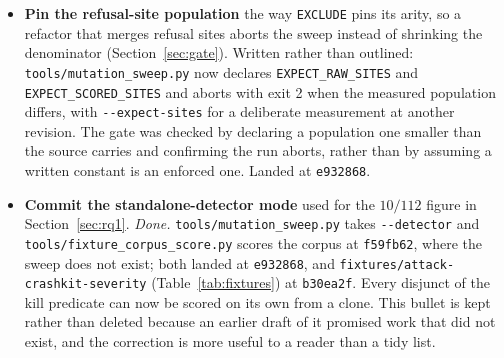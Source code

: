 \documentclass[11pt]{article}
\begin{document}
\begin{itemize}
red on another: the same host-dependence class the patch exists to remove. At
\texttt{ce462e10}, the head of the pull request on 2026-08-18 and resolvable only through
\texttt{git fetch origin pull/2/head} because the branch sits on a fork, those tests build
their structure in Python instead, and both issuer-data traversals are iterative with explicit
stacks, so the stated blocker is met by the pull request itself. The head carries a date
because it moved during drafting: the earlier \texttt{bb4dda36}, which this bullet named
first, still asserted a wall-clock bound on elapsed time, an instance of the same
host-dependence class; \texttt{ce462e10} drops that assertion and leaves \texttt{vac/}
byte-identical. What remains is review and merge. An earlier draft of this paper still
described the blocker as open, having been written against a stale reading of the branch;
that is instrument failure 4 recurring inside the paper's own outstanding-work list, which is
why it is corrected here in place rather than dropped.

\item \textbf{Pin the refusal-site population} the way \texttt{EXCLUDE} pins its arity, so a
refactor that merges refusal sites aborts the sweep instead of shrinking the denominator
(Section~\ref{sec:gate}). Written rather than outlined: \texttt{tools/mutation\_sweep.py} now
declares \texttt{EXPECT\_RAW\_SITES} and \texttt{EXPECT\_SCORED\_SITES} and aborts with exit 2
when the measured population differs, with \texttt{-{}-expect-sites} for a deliberate
measurement at another revision. The gate was checked by declaring a population one smaller
than the source carries and confirming the run aborts, rather than by assuming a written
constant is an enforced one. Landed at \texttt{e932868}.

\item \textbf{Commit the standalone-detector mode} used for the $10/112$ figure in
Section~\ref{sec:rq1}. \emph{Done.} \texttt{tools/mutation\_sweep.py} takes
\texttt{-{}-detector} and \texttt{tools/fixture\_corpus\_score.py} scores the corpus at
\texttt{f59fb62}, where the sweep does not exist; both landed at \texttt{e932868}, and
\texttt{fixtures/attack-crashkit-severity} (Table~\ref{tab:fixtures}) at \texttt{b30ea2f}.
Every disjunct of the kill predicate can now be scored on its own from a clone. This bullet is
kept rather than deleted because an earlier draft of it promised work that did not exist, and
the correction is more useful to a reader than a tidy list.
\end{itemize}
\end{document}
